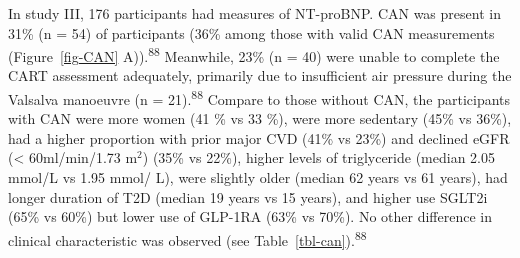 \documentclass[
  letterpaper,
  headsepline=true,
  open=any]{scrbook}
\begin{document}
In study III, 176 participants had measures of NT-proBNP. CAN was
present in 31\% (n = 54) of participants (36\% among those with valid
CAN measurements (Figure~\ref{fig-CAN} A)).\textsuperscript{88}
Meanwhile, 23\% (n = 40) were unable to complete the CART assessment
adequately, primarily due to insufficient air pressure during the
Valsalva manoeuvre (n = 21).\textsuperscript{88} Compare to those
without CAN, the participants with CAN were more women (41 \% vs 33 \%),
were more sedentary (45\% vs 36\%), had a higher proportion with prior
major CVD (41\% vs 23\%) and declined eGFR (\textless{} 60ml/min/1.73
m\(^2\)) (35\% vs 22\%), higher levels of triglyceride (median 2.05
mmol/L vs 1.95 mmol/ L), were slightly older (median 62 years vs 61
years), had longer duration of T2D (median 19 years vs 15 years), and
higher use SGLT2i (65\% vs 60\%) but lower use of GLP-1RA (63\% vs
70\%). No other difference in clinical characteristic was observed (see
Table~\ref{tbl-can}).\textsuperscript{88}

\end{document}

